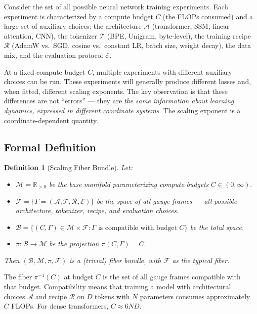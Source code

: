 \documentclass[12pt,a4paper]{article}
\newtheorem{definition}[theorem]{Definition}
\theoremstyle{remark}
\newcommand{\R}{\mathbb{R}}
\newcommand{\arch}{\mathcal{A}}
\newcommand{\tok}{\mathcal{T}}
\newcommand{\recipe}{\mathcal{R}}
\begin{document}
Consider the set of all possible neural network training experiments. Each experiment is characterized by a compute budget $C$ (the FLOPs consumed) and a large set of auxiliary choices: the architecture $\arch$ (transformer, SSM, linear attention, CNN), the tokenizer $\tok$ (BPE, Unigram, byte-level), the training recipe $\recipe$ (AdamW vs.\ SGD, cosine vs.\ constant LR, batch size, weight decay), the data mix, and the evaluation protocol $\mathcal{E}$.

At a fixed compute budget $C$, multiple experiments with different auxiliary choices can be run. These experiments will generally produce different losses and, when fitted, different scaling exponents. The key observation is that these differences are not ``errors'' — they are \emph{the same information about learning dynamics, expressed in different coordinate systems}. The scaling exponent is a coordinate-dependent quantity.

\subsection{Formal Definition}

\begin{definition}[Scaling Fiber Bundle]
\label{def:bundle}
Let:
\begin{itemize}
    \item $\mathcal{M} = \R_{>0}$ be the base manifold parameterizing compute budgets $C \in (0, \infty)$.
    \item $\mathcal{F} = \{\Gamma = (\arch, \tok, \recipe, \mathcal{E})\}$ be the space of all gauge frames — all possible architecture, tokenizer, recipe, and evaluation choices.
    \item $\mathcal{B} = \{(C, \Gamma) \in \mathcal{M} \times \mathcal{F} : \Gamma \text{ is compatible with budget } C\}$ be the total space.
    \item $\pi: \mathcal{B} \to \mathcal{M}$ be the projection $\pi(C, \Gamma) = C$.
\end{itemize}
Then $(\mathcal{B}, \mathcal{M}, \pi, \mathcal{F})$ is a (trivial) fiber bundle, with $\mathcal{F}$ as the typical fiber.
\end{definition}

The fiber $\pi^{-1}(C)$ at budget $C$ is the set of all gauge frames compatible with that budget. Compatibility means that training a model with architectural choices $\arch$ and recipe $\recipe$ on $D$ tokens with $N$ parameters consumes approximately $C$ FLOPs. For dense transformers, $C \approx 6ND$.
\end{document}
